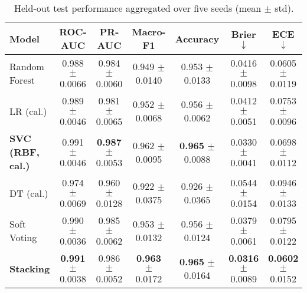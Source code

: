 \documentclass[conference]{IEEEtran}
\begin{document}
    \begin{table*}[t]
        \centering
        \small
        \setlength{\tabcolsep}{6pt}
        \caption{Held-out test performance aggregated over five seeds (mean \(\pm\) std).}
        \label{tab:test-heldout-with-bases}
        \begin{tabular}{lcccccc}
        \toprule
        \textbf{Model} & \textbf{ROC-AUC} & \textbf{PR-AUC} & \textbf{Macro-F1} & \textbf{Accuracy} & \textbf{Brier} \(\downarrow\) & \textbf{ECE} \(\downarrow\) \\
        \midrule
        Random Forest     & 0.988 \(\pm\) 0.0066 & 0.984 \(\pm\) 0.0060 & 0.949 \(\pm\) 0.0140 & 0.953 \(\pm\) 0.0133 & 0.0416 \(\pm\) 0.0098 & 0.0605 \(\pm\) 0.0119 \\
        LR (cal.)         & 0.989 \(\pm\) 0.0046 & 0.981 \(\pm\) 0.0065 & 0.952 \(\pm\) 0.0068 & 0.956 \(\pm\) 0.0062 & 0.0412 \(\pm\) 0.0051 & 0.0753 \(\pm\) 0.0096 \\
        \textbf{SVC (RBF, cal.)} & 0.991 \(\pm\) 0.0046 & \textbf{0.987} \(\pm\) 0.0053 & 0.962 \(\pm\) 0.0095 & \textbf{0.965} \(\pm\) 0.0088 & 0.0330 \(\pm\) 0.0041 & 0.0698 \(\pm\) 0.0112 \\
        DT (cal.)         & 0.974 \(\pm\) 0.0069 & 0.960 \(\pm\) 0.0128 & 0.922 \(\pm\) 0.0375 & 0.926 \(\pm\) 0.0365 & 0.0544 \(\pm\) 0.0154 & 0.0946 \(\pm\) 0.0133 \\
        Soft Voting       & 0.990 \(\pm\) 0.0036 & 0.985 \(\pm\) 0.0062 & 0.953 \(\pm\) 0.0132 & 0.956 \(\pm\) 0.0124 & 0.0379 \(\pm\) 0.0061 & 0.0795 \(\pm\) 0.0122 \\
        \textbf{Stacking} & \textbf{0.991} \(\pm\) 0.0038 & 0.986 \(\pm\) 0.0052 & \textbf{0.963} \(\pm\) 0.0172 & \textbf{0.965} \(\pm\) 0.0164 & \textbf{0.0316} \(\pm\) 0.0089 & \textbf{0.0602} \(\pm\) 0.0152 \\
        \bottomrule
        \end{tabular}
        \end{table*}
\end{document}
